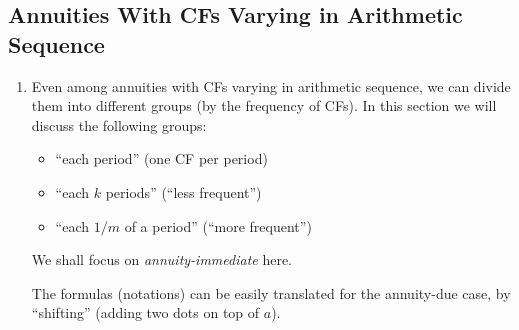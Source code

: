 \subsection{Annuities With CFs Varying in Arithmetic Sequence}
\begin{enumerate}
\item Even among annuities with CFs varying in arithmetic sequence, we can
divide them into different groups (by the frequency of CFs). In this section we
will discuss the following groups:
\begin{itemize}
\item ``each period'' (one CF per period)
\item ``each \(k\) periods'' (``less frequent'')
\item ``each \(1/m\) of a period'' (``more frequent'')
\end{itemize}
We shall focus on \emph{annuity-immediate} here.
\begin{note}
The formulas (notations) can be easily translated for the annuity-due case, by
``shifting'' (adding two dots on top of \(a\)).
\end{note}

\end{enumerate}
